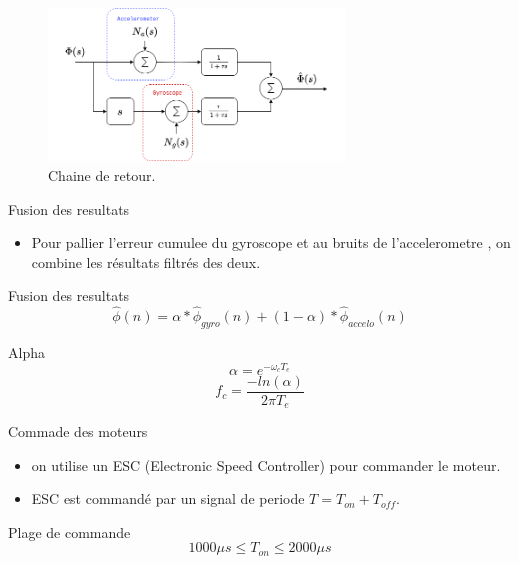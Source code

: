 \documentclass{beamer}
\begin{document}
\begin{frame}
	\begin{figure}
		\centering
		\includegraphics[width=0.7\textwidth]{assets/pitch-estimation.png}
		\caption{Chaine de retour.}
	\end{figure}
\end{frame}

\begin{frame}{Fusion des resultats}
	\begin{itemize}
		\item Pour pallier l'erreur cumulee du gyroscope et au bruits de l'accelerometre , on combine les résultats filtrés des deux.
	\end{itemize}
	\begin{block}{Fusion des resultats}
		\begin{equation*}
			\hat{\phi}(n) = \alpha * \hat{\phi}_{gyro}(n) + (1 - \alpha) * \hat{\phi}_{accelo}(n)
		\end{equation*}
	\end{block}
	\begin{block}{Alpha}
		\begin{equation*}
			\alpha = e^{-\omega_c T_e}
		\end{equation*}
		\begin{equation*}
			f_c = \frac{-ln(\alpha)}{2\pi T_e}
		\end{equation*}
	\end{block}
\end{frame}


\begin{frame}{Commade des moteurs}
	\begin{itemize}
		\item on utilise un ESC (Electronic Speed Controller) pour commander le moteur.
		\item ESC est commandé par un signal de periode $T = T_{on} + T_{off}$.
	\end{itemize}
	\begin{block}{Plage de commande}
		\begin{equation*}
				1000\mu s \leq T_{on} \leq 2000\mu s
		\end{equation*}
	\end{block}
\end{frame}
\end{document}

